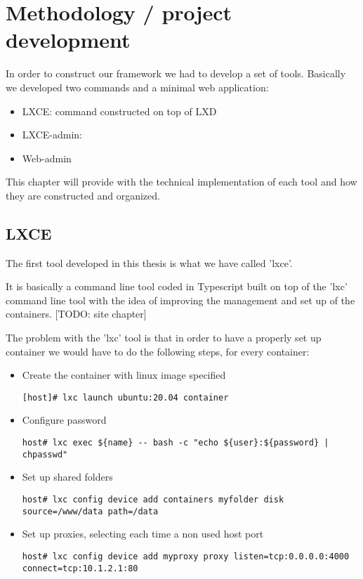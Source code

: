 \clearpage\section{Methodology / project development}

In order to construct our framework we had to develop a set of tools. Basically we developed two commands and a minimal web application:
\begin{itemize}
	\item{LXCE: command constructed on top of LXD}
	\item{LXCE-admin: }
	\item{Web-admin} 
\end{itemize}

This chapter will provide with the technical implementation of each tool and how they are constructed and organized. 

\subsection{LXCE}
The first tool developed in this thesis is what we have called 'lxce'.

It is basically a command line tool coded in Typescript built on top of the 'lxc' command line tool with the idea of improving the management and set up of the containers.
[TODO: site chapter]

The problem with the 'lxc' tool is that in order to have a properly set up container we would have to do the following steps, for every container:
\begin{itemize}
	\item{Create the container with linux image specified}
		\begin{verbatim}
[host]# lxc launch ubuntu:20.04 container
		\end{verbatim}
	\item{Configure password}
		\begin{verbatim}
host# lxc exec ${name} -- bash -c "echo ${user}:${password} | chpasswd"
		\end{verbatim}
	\item{Set up shared folders}
		\begin{verbatim}
host# lxc config device add containers myfolder disk source=/www/data path=/data
		\end{verbatim}
	\item{Set up proxies, selecting each time a non used host port}
		\begin{verbatim}
host# lxc config device add myproxy proxy listen=tcp:0.0.0.0:4000 connect=tcp:10.1.2.1:80
		\end{verbatim}
\end{itemize}

